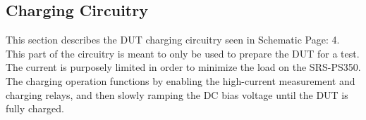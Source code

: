 \subsection{Charging Circuitry}

This section describes the DUT charging circuitry seen in Schematic Page: 4. This part of the circuitry is meant to only be used to prepare the DUT for a test. The current is purposely limited in order to minimize the load on the SRS-PS350. The charging operation functions by enabling the high-current measurement and charging relays, and then slowly ramping the DC bias voltage until the DUT is fully charged.

